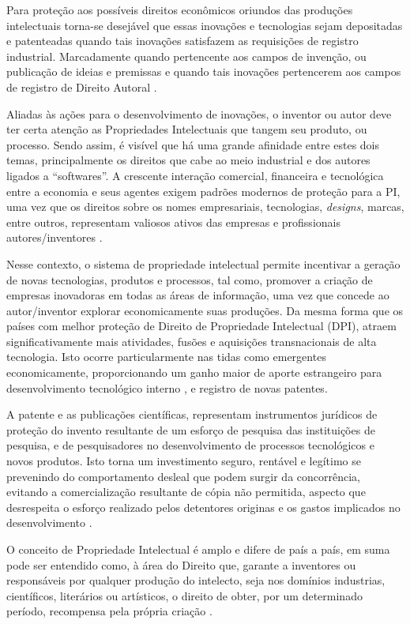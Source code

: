 Para proteção aos possíveis direitos econômicos oriundos das produções intelectuais torna-se desejável que essas inovações e tecnologias sejam depositadas e patenteadas quando tais inovações satisfazem as requisições de registro industrial. Marcadamente quando pertencente aos campos de invenção, ou publicação de ideias e premissas e quando tais inovações pertencerem aos campos de registro de Direito Autoral \cite{wipo_b06_2019}. 

Aliadas às ações para o desenvolvimento de inovações, o inventor ou autor deve ter certa atenção as Propriedades Intelectuais que tangem seu produto, ou processo. Sendo assim, é visível que há uma grande afinidade entre estes dois temas, principalmente os direitos que cabe ao meio industrial e dos autores ligados a “softwares”. A crescente interação comercial, financeira e tecnológica entre a economia e seus agentes exigem padrões modernos de proteção para a PI, uma vez que os direitos sobre os nomes empresariais, tecnologias, \textit{designs}, marcas, entre outros, representam valiosos ativos das empresas e profissionais autores/inventores \cite{sherwood_propriedade_1992}. 

Nesse contexto, o sistema de propriedade intelectual permite incentivar a geração de novas tecnologias, produtos e processos, tal como, promover a criação de empresas inovadoras em todas as áreas de informação, uma vez que concede ao autor/inventor explorar economicamente suas produções. Da mesma forma que os países com melhor proteção de Direito de Propriedade Intelectual (DPI), atraem significativamente mais atividades, fusões e aquisições transnacionais de alta tecnologia. Isto ocorre particularmente nas tidas como emergentes economicamente, proporcionando um ganho maior de aporte estrangeiro para desenvolvimento tecnológico interno \cite{hasan_impacts_2017}, e registro de novas patentes.

A patente e as publicações científicas, representam instrumentos jurídicos de proteção do invento resultante de um esforço de pesquisa das instituições de pesquisa, e de pesquisadores no desenvolvimento de processos tecnológicos e novos produtos. Isto torna um investimento seguro, rentável e legítimo se prevenindo do comportamento desleal que podem surgir da concorrência, evitando a comercialização resultante de cópia não permitida, aspecto que desrespeita o esforço realizado pelos detentores originas e os gastos implicados no desenvolvimento \cite{marques_natureza_2017}.

O conceito de Propriedade Intelectual é amplo e difere de país a país, em suma pode ser entendido como, à área do Direito que, garante a inventores ou responsáveis por qualquer produção do intelecto, seja nos domínios industrias, científicos, literários ou artísticos, o direito de obter, por um determinado período, recompensa pela própria criação \cite{aspi_aspi_2019}.

